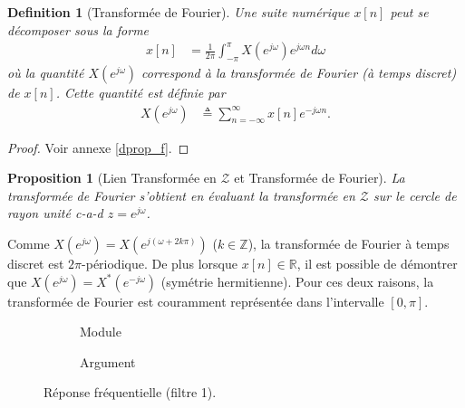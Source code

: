 \documentclass[11pt,a4paper]{IEEEtran}
\newtheorem{proposition}{Proposition}
\newtheorem{definition}{Definition}
\begin{document}
\begin{definition}[Transformée de Fourier]
\label{prop_f}
Une suite numérique $x[n]$ peut se décomposer sous la forme 
\begin{align}
x[n]&= \frac{1}{2\pi}\int_{-\pi}^{\pi} X(e^{j\omega})e^{j\omega n}d\omega \label{e_def_if}
\end{align}
où la quantité $X(e^{j\omega})$ correspond à la transformée de Fourier (à temps discret) de $x[n]$. Cette quantité est définie par
\begin{align}
X(e^{j\omega})&\triangleq \sum_{n=-\infty}^{\infty}x[n]e^{-j\omega n}.
\end{align}
\end{definition}
\begin{proof}
Voir annexe \ref{dprop_f}.
\end{proof}

\begin{proposition}[Lien Transformée en $\mathcal{Z}$ et Transformée de Fourier]
La transformée de Fourier s'obtient en évaluant la transformée en $\mathcal{Z}$ sur le cercle de rayon unité c-a-d $z=e^{j\omega}$.
\end{proposition}


Comme $X(e^{j\omega})=X(e^{j(\omega+2k\pi)})$ ($k \in \mathbb{Z}$), la transformée de Fourier à temps discret est $2\pi$-périodique. De plus lorsque $x[n]\in \mathbb{R}$, il est possible de démontrer que $X(e^{j\omega})=X^{*}(e^{-j\omega})$ (symétrie hermitienne). Pour ces deux raisons, la transformée de Fourier est couramment représentée dans l'intervalle $[0,\pi]$.



\begin{figure}[t]
\begin{subfigure}[b]{0.5\textwidth}
\centering
{}
\caption{Module}
\label{fig_f_abs}
\end{subfigure}%
\begin{subfigure}[b]{0.5\textwidth}
\centering
{}
\caption{Argument }
\end{subfigure}
\caption{Réponse fréquentielle (filtre 1).}
\label{fig_z2f}
\end{figure}
\end{document}
